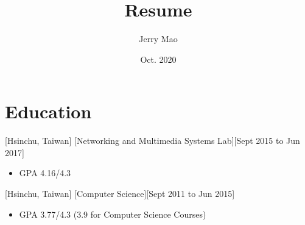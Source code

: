 \documentclass{article}
\title{Resume}
\author{Jerry Mao}
\date{Oct. 2020}
\begin{document}

\makecvtitle %

\section{Education}
[Hsinchu, Taiwan]
[Networking and Multimedia Systems Lab][Sept 2015 to Jun 2017]

\begin{itemize}
\item GPA 4.16/4.3
\end{itemize}

[Hsinchu, Taiwan]
[Computer Science][Sept 2011 to Jun 2015]
\begin{itemize}
\item GPA 3.77/4.3 (3.9 for Computer Science Courses)
\end{itemize}
\end{document}
